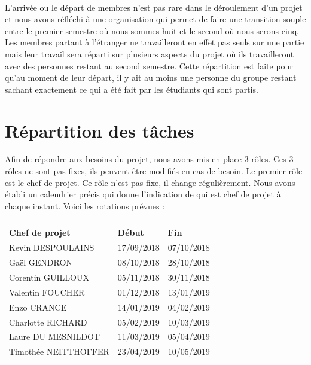 \paragraph{}
L’arrivée ou le départ de membres n’est pas rare dans le déroulement d’un projet et nous avons
réfléchi à une organisation qui permet de faire une transition souple entre le premier semestre
où nous sommes huit et le second où nous serons cinq. Les membres partant à l’étranger ne
travailleront en effet pas seuls sur une partie mais leur travail sera réparti sur plusieurs
aspects du projet où ils travailleront avec des personnes restant au second semestre. Cette
répartition est faite pour qu’au moment de leur départ, il y ait au moins une personne du groupe
restant sachant exactement ce qui a été fait par les étudiants qui sont partis.

\section{Répartition des tâches}

Afin de répondre aux besoins du projet, nous avons mis en place 3 rôles. Ces 3 rôles ne sont pas fixes,
ils peuvent être modifiés en cas de besoin. Le premier rôle est le chef de projet. Ce rôle n’est pas fixe,
il change régulièrement. Nous avons établi un calendrier précis qui donne l’indication de qui
est chef de projet à chaque instant. Voici les rotations prévues :

\paragraph{}
\begin{center}
\begin{tabular}{ | l | l | l | }
\hline
{\textbf{Chef de projet}}   &   {\textbf{Début}}    &   {\textbf{Fin}}  \\ \hline \rowcolor[RGB]{182, 215, 168}
{Kevin DESPOULAINS}         &   {17/09/2018}        &	{07/10/2018}    \\ \hline \rowcolor[RGB]{255, 229, 153}
{Gaël GENDRON}              &   {08/10/2018}	    &	{28/10/2018}    \\ \hline \rowcolor[RGB]{249, 203, 156}
{Corentin GUILLOUX}         &   {05/11/2018}	    &	{30/11/2018}    \\ \hline \rowcolor[RGB]{234, 153, 153}
{Valentin FOUCHER}          &   {01/12/2018}	    &	{13/01/2019}    \\ \hline \rowcolor[RGB]{221, 126, 107}
{Enzo CRANCE}               &   {14/01/2019}	    &	{04/02/2019}    \\ \hline \rowcolor[RGB]{213, 166, 189}
{Charlotte RICHARD}         &   {05/02/2019}	    &	{10/03/2019}    \\ \hline \rowcolor[RGB]{180, 167, 214}
{Laure DU MESNILDOT}        &   {11/03/2019}	    &	{05/04/2019}    \\ \hline \rowcolor[RGB]{159, 197, 232}
{Timothée NEITTHOFFER}      &	{23/04/2019}	    &	{10/05/2019}    \\ \hline
\end{tabular}
\end{center}

